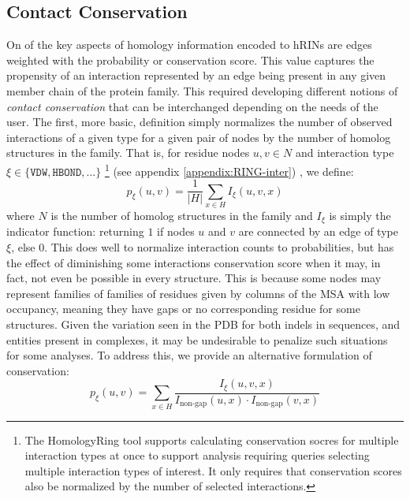 \subsection{Contact Conservation}
\label{subsec:def-conservation}
On of the key aspects of homology information encoded to hRINs are edges weighted with the probability or conservation score. This value captures the propensity of an interaction represented by an edge being present in any given member chain of the protein family. 
This required developing different notions of \emph{contact conservation} that can be interchanged depending on the needs of the user. 
The first, more basic, definition simply normalizes the number of observed interactions of a given type for a given pair of nodes by the number of homolog structures in the family. That is, for residue nodes $u,v \in N$ and interaction type $\xi\in\{\texttt{VDW}, \texttt{HBOND}, ...\}$ 
\footnote{The HomologyRing tool supports calculating conservation socres for multiple interaction types at once to support analysis requiring queries selecting multiple interaction types of interest. It only requires that conservation scores also be normalized by the number of selected interactions.} 
(see appendix \ref{appendix:RING-inter}) , we define:
$$p_\xi(u,v) = \frac{1}{|H|} \sum\limits_{x \in H} I_{\xi}(u, v, x)$$ 
where $N$ is the number of homolog structures in the family and $I_\xi$ is simply the indicator function: returning $1$ if nodes $u$ and $v$ are connected by an edge of type $\xi$, else $0$. This does well to normalize interaction counts to probabilities, but has the effect of diminishing some interactions conservation score when it may, in fact, not even be possible in every structure. This is because some nodes may represent families of families of residues given by columns of the MSA with low occupancy, meaning they have gaps or no corresponding residue for some structures. Given the variation seen in the PDB for both indels in sequences, and entities present in complexes, it may be undesirable to penalize such situations for some analyses. To address this, we provide an alternative formulation of conservation:
$$p_\xi(u,v)=\sum\limits_{x\in H}\frac{I_\xi(u,v,x)}{I_\text{non-gap}(u,x) \cdot I_\text{non-gap}(v,x)}$$
